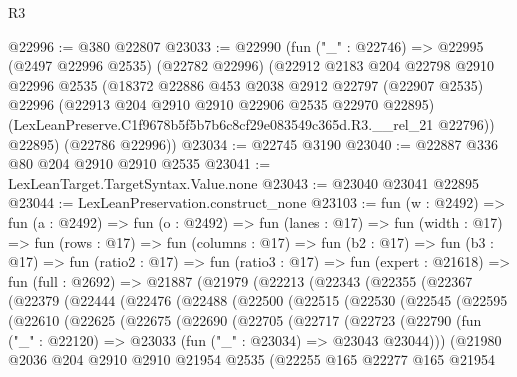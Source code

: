 \begin{lexlean}{R3}
\begin{coremodule}
@22996 := @380 @22807
@23033 := @22990
    (fun ("_" : @22746) =>
    @22995
      (@2497 @22996 @2535)
      (@22782 @22996)
      (@22912
        @2183
        @204
        @22798
        @2910
        @22996
        @2535
        (@18372
          @22886
          @453
          @2038
          @2912
          @22797
          (@22907 @2535)
          @22996
          (@22913 @204 @2910 @2910 @22906 @2535 @22970 @22895)
          (LexLeanPreserve.C1f9678b5f5b7b6c8cf29e083549c365d.R3.__rel_21 @22796))
        @22895)
      (@22786 @22996))
@23034 := @22745 @3190
@23040 := @22887 @336 @80 @204 @2910 @2910 @2535
@23041 := LexLeanTarget.TargetSyntax.Value.none
@23043 := @23040 @23041 @22895
@23044 := LexLeanPreservation.construct_none
@23103 := fun (w : @2492) =>
  fun (a : @2492) =>
  fun (o : @2492) =>
  fun (lanes : @17) =>
  fun (width : @17) =>
  fun (rows : @17) =>
  fun (columns : @17) =>
  fun (b2 : @17) =>
  fun (b3 : @17) =>
  fun (ratio2 : @17) =>
  fun (ratio3 : @17) =>
  fun (expert : @21618) =>
  fun (full : @2692) =>
  @21887
    (@21979
      (@22213
        (@22343
          (@22355
            (@22367
              (@22379
                (@22444
                  (@22476
                    (@22488
                      (@22500
                        (@22515
                          (@22530
                            (@22545
                              (@22595
                                (@22610
                                  (@22625
                                    (@22675
                                      (@22690
                                        (@22705
                                          (@22717
                                            (@22723
                                              (@22790
                                                (fun ("_" : @22120) =>
                                                @23033 (fun ("_" : @23034) => @23043 @23044)))
                                              (@21980
                                                @2036
                                                @204
                                                @2910
                                                @2910
                                                @21954
                                                @2535
                                                (@22255
                                                  @165
                                                  @22277
                                                  @165
                                                  @21954

\end{coremodule}
\end{lexlean}
